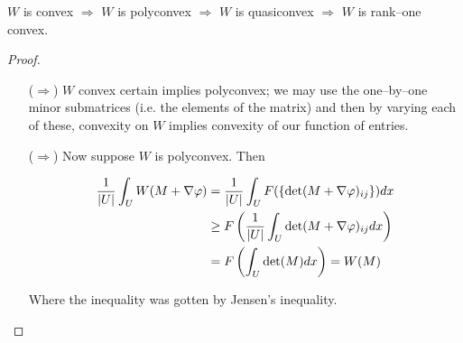 \documentclass[../main.tex]{subfiles}
\begin{document}
\begin{thm}
  $W$ is convex $\Rightarrow$ $W$ is polyconvex $\Rightarrow$ $W$ is quasiconvex $\Rightarrow$ $W$ is rank--one convex.
\end{thm}

\begin{proof}

  
\begin{itemize}
\item[($\Rightarrow$)]   $W$ convex certain implies polyconvex; we may use the one--by--one minor submatrices (i.e. the elements of the matrix) and then by varying each of these, convexity on $W$ implies convexity of our function of entries. 
\item[($\Rightarrow$)] Now suppose $W$ is polyconvex.
  Then

  \begin{align*}
    \frac{1}{\abs{U}} \int_U W(M + \nabla \varphi) &= \frac{1}{\abs{U}} \int_U F( \set{\mathrm{det}( M + \nabla \varphi)_{ij}} ) dx \\
                                     &\geq F\left( \frac{1}{\abs{U}} \int_U \mathrm{det} (M + \nabla \varphi)_{ij} dx \right) \\
    
                                     &= F \left( \int_U \mathrm{det} (M) dx \right) = W(M) \\
  \end{align*}

  Where the inequality was gotten by Jensen's inequality.

\end{itemize}


  
\end{proof}


\printbibliography
\end{document}

